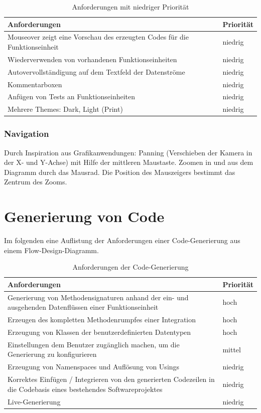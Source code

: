 \begin{table}[H]
\begin{tabularx}{\textwidth}{X|l}

	Anforderungen & Priorität\\
	\hline \hline
Mouseover zeigt eine Vorschau des erzeugten Codes für die Funktionseinheit & niedrig\\ \hline
Wiederverwenden von vorhandenen Funktionseinheiten & niedrig\\ \hline
Autovervollständigung auf dem Textfeld der Datenströme & niedrig\\ \hline
Kommentarboxen & niedrig\\ \hline
Anfügen von Tests an Funktionseinheiten & niedrig\\ \hline
Mehrere Themes: Dark, Light (Print) & niedrig\\ \hline
\end{tabularx}
\caption{Anforderungen mit niedriger Priorität}
\end{table}



\subsubsection{Navigation}

Durch Inspiration aus Grafikanwendungen: Panning (Verschieben der Kamera in
der X- und Y-Achse) mit Hilfe der mittleren Maustaste. Zoomen in und aus dem
Diagramm durch das Mausrad. Die Position des Mauszeigers bestimmt das Zentrum des
Zooms.


\section{Generierung von Code}

Im folgenden eine Auflistung der Anforderungen einer Code-Generierung aus einem Flow-Design-Diagramm.

\begin{table}[H]
\begin{tabularx}{\textwidth}{X|l}
Anforderungen & Priorität\\
\hline
\hline
Generierung von Methodensignaturen anhand der ein- und ausgehenden Datenflüssen einer Funktionseinheit & hoch\\
\hline
Erzeugen des kompletten Methodenrumpfes einer Integration & hoch\\
\hline
Erzeugung von Klassen der benutzerdefinierten Datentypen & hoch\\
\hline
Einstellungen  dem Benutzer zugänglich machen, um die Generierung zu konfigurieren & mittel\\
\hline
Erzeugung von Namenspaces und Auflösung von Usings & niedrig\\
\hline
Korrektes Einfügen / Integrieren von den generierten Codezeilen in die Codebasis eines bestehendes Softwareprojektes & niedrig\\
\hline
Live-Generierung & niedrig\\
\hline
\end{tabularx}
\caption{Anforderungen der Code-Generierung}
\end{table}



